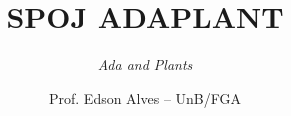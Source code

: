 \title{SPOJ ADAPLANT}
\subtitle{\textit{Ada and Plants}}
\author{Prof. Edson Alves -- UnB/FGA}
\date{}
